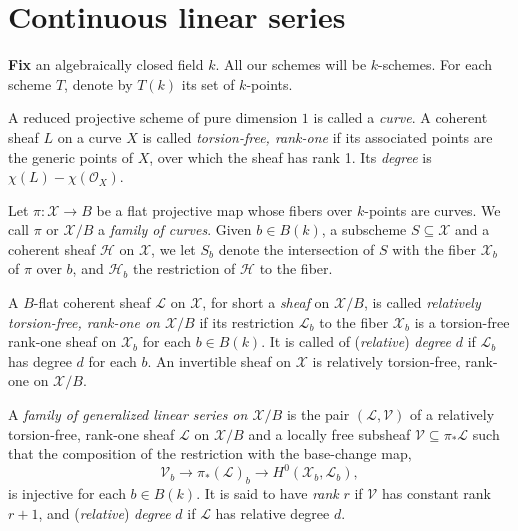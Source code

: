 \documentclass[a4paper,11pt]{amsart}
\theoremstyle{plain}
\theoremstyle{definition}
\theoremstyle{remark}
\def\L{\mathcal{L}}
\def\V{\mathcal{V}}
\begin{document}


\section{Continuous linear series}\label{sec:stablells}

\textbf{Fix} an algebraically closed field $k$. All our schemes will be $k$-schemes. For each scheme $T$, denote by $T(k)$ its set of $k$-points. 

A reduced projective scheme of pure dimension $1$ is called a \emph{curve}. A coherent sheaf $L$ on a curve $X$ is called \emph{torsion-free, rank-one} if its associated points are the generic points of $X$, over which the sheaf has rank 1. Its \emph{degree} is $\chi(L)-\chi(\mathcal O_X)$.

Let $\pi:\mathcal{X}\rightarrow B$ be a flat projective map whose fibers over $k$-points are curves. We call $\pi$ or $\mathcal{X}/B$ a \emph{family of curves}. Given $b\in B(k)$, a subscheme $S\subseteq\mathcal X$ and a coherent sheaf $\mathcal H$ on $\mathcal{X}$, we let $S_b$ denote the intersection of $S$ with the fiber $\mathcal X_b$ of $\pi$ over $b$, and $\mathcal H_b$ the restriction of $\mathcal H$ to the fiber.

A $B$-flat coherent sheaf $\mathcal L$ on $\mathcal{X}$, for short a \emph{sheaf} on $\mathcal X/B$, is called \emph{relatively torsion-free, rank-one on $\mathcal{X}/B$} if its restriction $\mathcal L_b$ to the fiber $\mathcal{X}_b$ is a torsion-free rank-one sheaf on $\mathcal{X}_b$ for each $b\in B(k)$. It is called of (\emph{relative}) \emph{degree} $d$ if $\mathcal L_b$ has degree $d$ for each $b$. An invertible sheaf on $\mathcal X$ is relatively torsion-free, rank-one on $\mathcal{X}/B$.

A \emph{family of generalized linear series on $\mathcal X/B$} is the pair $(\L,\V)$ of a relatively torsion-free, rank-one sheaf $\mathcal L$ on $\mathcal{X}/B$ and a locally free subsheaf 
$\mathcal V\subseteq\pi_*\mathcal L$ such that the composition of the restriction with the base-change map,
$$
\mathcal V_b\to\pi_*(\mathcal L)_b\to H^0(\mathcal X_b,\mathcal L_b),
$$
is injective for each $b\in B(k)$. It is said to have \emph{rank} $r$ if $\mathcal V$ has constant rank $r+1$, and (\emph{relative}) \emph{degree} $d$ if $\mathcal L$ has relative degree $d$. 
\end{document}
